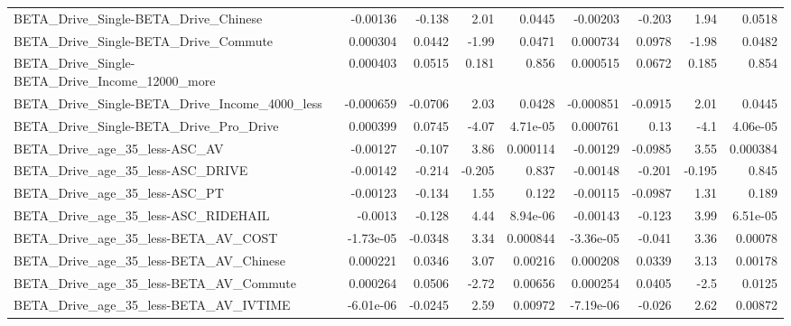 \begin{tabular}{lrrrrrrrr}
BETA\_Drive\_Single-BETA\_Drive\_Chinese               &    -0.00136 &       -0.138 &      2.01 &   0.0445 &   -0.00203 &      -0.203 &         1.94 &        0.0518 \\
BETA\_Drive\_Single-BETA\_Drive\_Commute               &    0.000304 &       0.0442 &     -1.99 &   0.0471 &   0.000734 &      0.0978 &        -1.98 &        0.0482 \\
BETA\_Drive\_Single-BETA\_Drive\_Income\_12000\_more     &    0.000403 &       0.0515 &     0.181 &    0.856 &   0.000515 &      0.0672 &        0.185 &         0.854 \\
BETA\_Drive\_Single-BETA\_Drive\_Income\_4000\_less      &   -0.000659 &      -0.0706 &      2.03 &   0.0428 &  -0.000851 &     -0.0915 &         2.01 &        0.0445 \\
BETA\_Drive\_Single-BETA\_Drive\_Pro\_Drive             &    0.000399 &       0.0745 &     -4.07 & 4.71e-05 &   0.000761 &        0.13 &         -4.1 &      4.06e-05 \\
BETA\_Drive\_age\_35\_less-ASC\_AV                      &    -0.00127 &       -0.107 &      3.86 & 0.000114 &   -0.00129 &     -0.0985 &         3.55 &      0.000384 \\
BETA\_Drive\_age\_35\_less-ASC\_DRIVE                   &    -0.00142 &       -0.214 &    -0.205 &    0.837 &   -0.00148 &      -0.201 &       -0.195 &         0.845 \\
BETA\_Drive\_age\_35\_less-ASC\_PT                      &    -0.00123 &       -0.134 &      1.55 &    0.122 &   -0.00115 &     -0.0987 &         1.31 &         0.189 \\
BETA\_Drive\_age\_35\_less-ASC\_RIDEHAIL                &     -0.0013 &       -0.128 &      4.44 & 8.94e-06 &   -0.00143 &      -0.123 &         3.99 &      6.51e-05 \\
BETA\_Drive\_age\_35\_less-BETA\_AV\_COST                &   -1.73e-05 &      -0.0348 &      3.34 & 0.000844 &  -3.36e-05 &      -0.041 &         3.36 &       0.00078 \\
BETA\_Drive\_age\_35\_less-BETA\_AV\_Chinese             &    0.000221 &       0.0346 &      3.07 &  0.00216 &   0.000208 &      0.0339 &         3.13 &       0.00178 \\
BETA\_Drive\_age\_35\_less-BETA\_AV\_Commute             &    0.000264 &       0.0506 &     -2.72 &  0.00656 &   0.000254 &      0.0405 &         -2.5 &        0.0125 \\
BETA\_Drive\_age\_35\_less-BETA\_AV\_IVTIME              &   -6.01e-06 &      -0.0245 &      2.59 &  0.00972 &  -7.19e-06 &      -0.026 &         2.62 &       0.00872 \\

\end{tabular}
